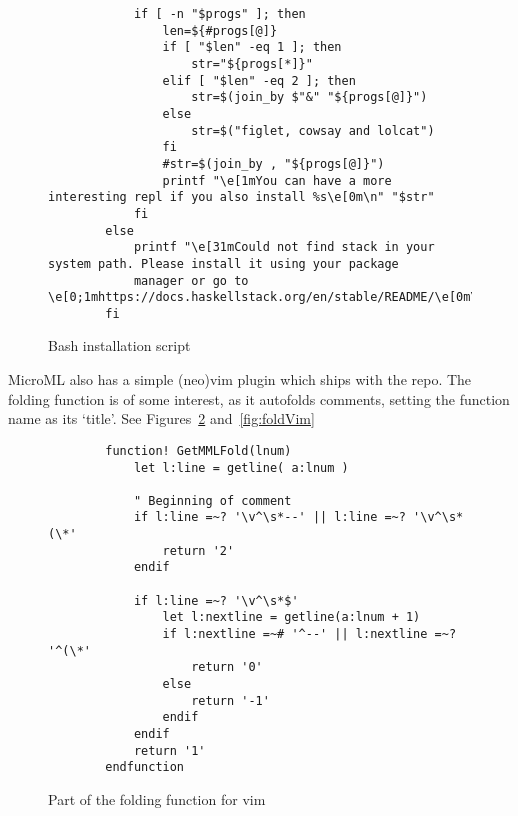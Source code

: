 \begin{figure}
\begin{verbatim}
            if [ -n "$progs" ]; then
                len=${#progs[@]}
                if [ "$len" -eq 1 ]; then
                    str="${progs[*]}"
                elif [ "$len" -eq 2 ]; then
                    str=$(join_by $"&" "${progs[@]}")
                else 
                    str=$("figlet, cowsay and lolcat")
                fi
                #str=$(join_by , "${progs[@]}")
                printf "\e[1mYou can have a more interesting repl if you also install %s\e[0m\n" "$str"
            fi
        else 
            printf "\e[31mCould not find stack in your system path. Please install it using your package
            manager or go to \e[0;1mhttps://docs.haskellstack.org/en/stable/README/\e[0m\n"
        fi
    \end{verbatim}
    \caption{Bash installation script}
\label{fig:installation}
\end{figure}

MicroML also has a simple (neo)vim plugin which ships with the repo. The folding function is of some
interest, as it autofolds comments, setting the function name as its `title'. See
Figures~\ref{fig:fold} and~\ref{fig:foldVim}

\begin{figure}
    \begin{verbatim}
        function! GetMMLFold(lnum) 
            let l:line = getline( a:lnum )

            " Beginning of comment
            if l:line =~? '\v^\s*--' || l:line =~? '\v^\s*(\*'
                return '2'
            endif

            if l:line =~? '\v^\s*$'
                let l:nextline = getline(a:lnum + 1)
                if l:nextline =~# '^--' || l:nextline =~? '^(\*'
                    return '0'
                else
                    return '-1'
                endif
            endif
            return '1'
        endfunction 
    \end{verbatim}
    \caption{Part of the folding function for vim}
\label{fig:fold}
\end{figure}
